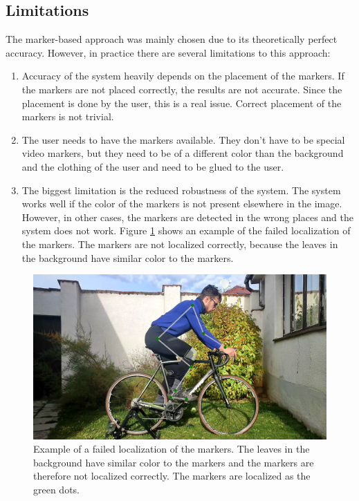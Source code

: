 \subsection{Limitations}
The marker-based approach was mainly chosen due to its theoretically perfect accuracy. However, in practice there are several limitations to this approach:

\begin{enumerate}
    \item Accuracy of the system heavily depends on the placement of the markers. If the markers are not placed correctly, the results are not accurate. Since the placement is done by the user, this is a real issue. Correct placement of the markers is not trivial.
    \item The user needs to have the markers available. They don't have to be special video markers, but they need to be of a different color than the background and the clothing of the user and need to be glued to the user.
    \item The biggest limitation is the reduced robustness of the system. The system works well if the color of the markers is not present elsewhere in the image. However, in other cases, the markers are detected in the wrong places and the system does not work. Figure \ref{fig:failed_localization} shows an example of the failed localization of the markers. The markers are not localized correctly, because the leaves in the background have similar color to the markers.
\end{enumerate}

\begin{figure}[htbp]
    \centering
    \includegraphics[width=\textwidth]{obrazky-figures/failed_localization.png}
    \caption{Example of a failed localization of the markers. The leaves in the background have similar color to the markers and the markers are therefore not localized correctly. The markers are localized as the green dots.}
    \label{fig:failed_localization}
\end{figure}

